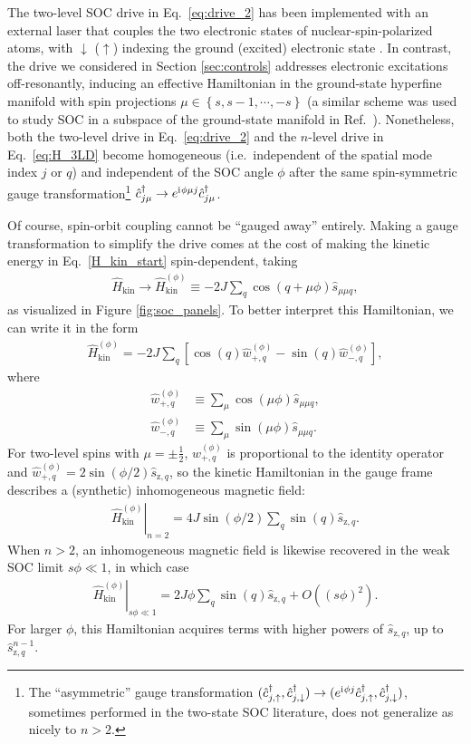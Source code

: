 \documentclass[aps,pra,nofootinbib,twocolumn,superscriptaddress]{revtex4-2}
\renewcommand{\t}{\text} %
\newcommand{\p}[1]{\left(#1\right)} %
\renewcommand{\sp}[1]{\left[#1\right]} %
\renewcommand{\set}[1]{\left\{#1\right\}} %
\renewcommand{\i}{\mathrm{i}\mkern1mu} %
\newcommand{\1}{\mathds{1}}
\renewcommand{\c}{\hat c}
\newcommand{\s}{\hat s}
\renewcommand{\H}{\hat H}
\newcommand{\up}{\uparrow}
\newcommand{\dn}{\downarrow}
\newcommand{\z}{\text{z}}
\begin{document}
The two-level SOC drive in Eq.~\eqref{eq:drive_2} has been implemented with an external laser that couples the two electronic states of nuclear-spin-polarized atoms, with $\dn$ ($\up$) indexing the ground (excited) electronic state \cite{wall2016synthetic, livi2016synthetic, kolkowitz2016spinorbitcoupled, bromley2018dynamics, he2019engineering}.
In contrast, the drive we considered in Section \ref{sec:controls} addresses electronic excitations off-resonantly, inducing an effective Hamiltonian in the ground-state hyperfine manifold with spin projections $\mu\in\set{s,s-1,\cdots,-s}$ (a similar scheme was used to study SOC in a subspace of the ground-state manifold in Ref.~\cite{mancini2015observation}).
Nonetheless, both the two-level drive in Eq.~\eqref{eq:drive_2} and the $n$-level drive in Eq.~\eqref{eq:H_3LD} become homogeneous (i.e.~independent of the spatial mode index $j$ or $q$) and independent of the SOC angle $\phi$ after the same spin-symmetric gauge transformation\footnote{The ``asymmetric'' gauge transformation $(\c_{j,\up}^\dag,\c_{j,\dn}^\dag)\to(e^{\i\phi j} \c_{j,\up}^\dag,\c_{j,\dn}^\dag)$, sometimes performed in the two-state SOC literature, does not generalize as nicely to $n>2$.} $\c_{j\mu}^\dag\to e^{\i\phi\mu j} \c_{j\mu}^\dag$.

Of course, spin-orbit coupling cannot be ``gauged away'' entirely.
Making a gauge transformation to simplify the drive comes at the cost of making the kinetic energy in Eq.~\eqref{H_kin_start} spin-dependent, taking
\begin{align}
  \H_{\t{kin}} \to \H_{\t{kin}}^{(\phi)}
  \equiv -2J \sum_q \cos\p{q+\mu\phi} \s_{\mu\mu q},
\end{align}
as visualized in Figure \ref{fig:soc_panels}.
To better interpret this Hamiltonian, we can write it in the form
\begin{align}
  \H_{\t{kin}}^{(\phi)}
  = -2J \sum_q
  \sp{\cos\p{q} \hat w_{+,q}^{(\phi)} - \sin\p{q} \hat w_{-,q}^{(\phi)}},
\end{align}
where
\begin{align}
  \hat w_{+,q}^{(\phi)} &\equiv \sum_\mu \cos\p{\mu\phi} \s_{\mu\mu q}, \\
  \hat w_{-,q}^{(\phi)} &\equiv \sum_\mu \sin\p{\mu\phi} \s_{\mu\mu q}.
\end{align}
For two-level spins with $\mu=\pm\frac12$, $\hat w_{+,q}^{(\phi)}$ is proportional to the identity operator and $\hat w_{+,q}^{(\phi)} = 2\sin\p{\phi/2} \s_{\z,q}$, so the kinetic Hamiltonian in the gauge frame describes a (synthetic) inhomogeneous magnetic field:
\begin{align}
  \left. \H_{\t{kin}}^{(\phi)} \right|_{n=2}
  = 4 J \sin\p{\phi/2} \sum_q \sin\p{q} \s_{\z,q}.
\end{align}
When $n>2$, an inhomogeneous magnetic field is likewise recovered in the weak SOC limit $s\phi\ll1$, in which case
\begin{align}
  \left. \H_{\t{kin}}^{(\phi)} \right|_{s\phi\ll1}
  = 2J\phi \sum_q \sin\p{q} \s_{\z,q} + O\p{(s\phi)^2}.
\end{align}
For larger $\phi$, this Hamiltonian acquires terms with higher powers of $\s_{\z,q}$, up to $\s_{\z,q}^{n-1}$.
\end{document}
